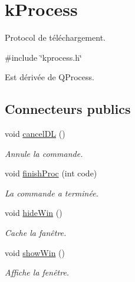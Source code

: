 \hypertarget{classkProcess}{}\section{k\+Process}
\label{classkProcess}


Protocol de téléchargement.  




{\ttfamily \#include \char`\"{}kprocess.\+h\char`\"{}}



Est dérivée de Q\+Process.

\subsection*{Connecteurs publics}
\begin{DoxyCompactItemize}
\item 
\mbox{\label{classkProcess_adce39310562b547379ebd0dad0a7dfba}} 
void \hyperlink{classkProcess_adce39310562b547379ebd0dad0a7dfba}{cancel\+DL} ()
\begin{DoxyCompactList}\small\item\em Annule la commande. \end{DoxyCompactList}\item 
void \hyperlink{classkProcess_aa9353ddae96a106044fa299ae2378087}{finish\+Proc} (int code)
\begin{DoxyCompactList}\small\item\em La commande a terminée. \end{DoxyCompactList}\item 
\mbox{\label{classkProcess_aee2348f82d367b9e52f47969a0e0146d}} 
void \hyperlink{classkProcess_aee2348f82d367b9e52f47969a0e0146d}{hide\+Win} ()
\begin{DoxyCompactList}\small\item\em Cache la fanêtre. \end{DoxyCompactList}\item 
\mbox{\label{classkProcess_a12b7b398d9794dcc293ded8fa9c76989}} 
void \hyperlink{classkProcess_a12b7b398d9794dcc293ded8fa9c76989}{show\+Win} ()
\begin{DoxyCompactList}\small\item\em Affiche la fenêtre. \end{DoxyCompactList}\end{DoxyCompactItemize}

